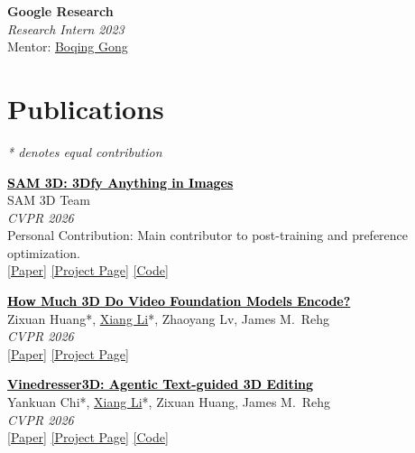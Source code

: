 \documentclass[11pt,letterpaper]{article}
\newcommand{\papertitle}[2]{\href{#1}{\textcolor{black}{\textbf{#2}}}}
\newcommand{\cventry}[4]{
    \noindent\textbf{#1} \hfill #2 \\
    \textit{#3} \hfill \textit{#4}
}
\begin{document}
\vspace{8pt}

\cventry{Google Research}{}{Research Intern}{2023} \\
Mentor: \href{https://boqinggong.github.io/}{Boqing Gong}

\section{Publications}

\textit{* denotes equal contribution}

\vspace{6pt}

\begin{enumerate}[leftmargin=*, label={[\arabic*]}]

    \item \papertitle{https://ai.meta.com/sam3d/}{SAM 3D: 3Dfy Anything in Images} \\
    SAM 3D Team \\
    \textit{CVPR 2026} \\
    Personal Contribution: Main contributor to post-training and preference optimization. \\
    {\small \href{https://arxiv.org/pdf/2511.16624}{[Paper]} \href{https://ai.meta.com/sam3d/}{[Project Page]} \href{https://github.com/facebookresearch/sam-3d-objects}{[Code]}}

    \item \papertitle{https://vidfm-3d-probe.github.io/}{How Much 3D Do Video Foundation Models Encode?} \\
    Zixuan Huang*, \underline{Xiang Li}*, Zhaoyang Lv, James M.\ Rehg \\
    \textit{CVPR 2026} \\
    {\small \href{https://vidfm-3d-probe.github.io/static/assets/vidfm_3d_probe.pdf}{[Paper]} \href{https://vidfm-3d-probe.github.io/}{[Project Page]}}

    \item \papertitle{https://vinedresser3d.github.io/}{Vinedresser3D: Agentic Text-guided 3D Editing} \\
    Yankuan Chi*, \underline{Xiang Li}*, Zixuan Huang, James M.\ Rehg \\
    \textit{CVPR 2026} \\
    {\small \href{https://vinedresser3d.github.io/assets/vinedresser3d.pdf}{[Paper]} \href{https://vinedresser3d.github.io/}{[Project Page]} \href{https://github.com/ykchizs/Vinedresser3D}{[Code]}}


\end{enumerate}
\end{document}
